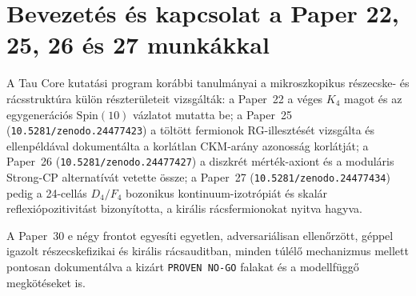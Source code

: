 \documentclass[11pt,a4paper]{article}
\begin{document}
\section{Bevezetés és kapcsolat a Paper 22, 25, 26 és 27 munkákkal}
A Tau Core kutatási program korábbi tanulmányai a mikroszkopikus részecske- és rácsstruktúra külön részterületeit vizsgálták: a Paper~22 a véges $K_4$ magot és az egygenerációs $\mathrm{Spin}(10)$ vázlatot mutatta be; a Paper~25 (\texttt{10.5281/zenodo.24477423}) a töltött fermionok RG-illesztését vizsgálta és ellenpéldával dokumentálta a korlátlan CKM-arány azonosság korlátját; a Paper~26 (\texttt{10.5281/zenodo.24477427}) a diszkrét mérték-axiont és a moduláris Strong-CP alternatívát vetette össze; a Paper~27 (\texttt{10.5281/zenodo.24477434}) pedig a 24-cellás $D_4/F_4$ bozonikus kontinuum-izotrópiát és skalár reflexiópozitivitást bizonyította, a királis rácsfermionokat nyitva hagyva.

A Paper~30 e négy frontot egyesíti egyetlen, adversariálisan ellenőrzött, géppel igazolt részecskefizikai és királis rácsauditban, minden túlélő mechanizmus mellett pontosan dokumentálva a kizárt \texttt{PROVEN NO-GO} falakat és a modellfüggő megkötéseket is.
\end{document}
